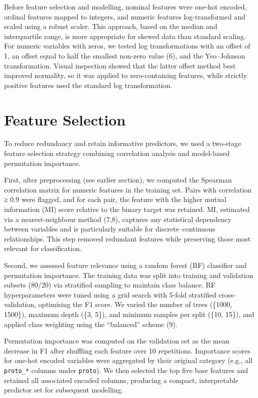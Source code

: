 \documentclass[
  a4paper,
]{scrreprt}
\begin{document}
Before feature selection and modelling, nominal features were one-hot
encoded, ordinal features mapped to integers, and numeric features
log-transformed and scaled using a robust scaler. This approach, based
on the median and interquartile range, is more appropriate for skewed
data than standard scaling. For numeric variables with zeros, we tested
log transformations with an offset of 1, an offset equal to half the
smallest non-zero value (6), and the Yeo--Johnson transformation. Visual
inspection showed that the latter offset method best improved normality,
so it was applied to zero-containing features, while strictly positive
features used the standard log transformation.

\section{Feature Selection}\label{feature-selection}

To reduce redundancy and retain informative predictors, we used a
two-stage feature selection strategy combining correlation analysis and
model-based permutation importance.

First, after preprocessing (see earlier section), we computed the
Spearman correlation matrix for numeric features in the training set.
Pairs with correlation ≥ 0.9 were flagged, and for each pair, the
feature with the higher mutual information (MI) score relative to the
binary target was retained. MI, estimated via a nearest-neighbour method
(7,8), captures any statistical dependency between variables and is
particularly suitable for discrete--continuous relationships. This step
removed redundant features while preserving those most relevant for
classification.

Second, we assessed feature relevance using a random forest (RF)
classifier and permutation importance. The training data was split into
training and validation subsets (80/20) via stratified sampling to
maintain class balance. RF hyperparameters were tuned using a grid
search with 5-fold stratified cross-validation, optimising the F1 score.
We varied the number of trees (\{1000, 1500\}), maximum depth (\{3,
5\}), and minimum samples per split (\{10, 15\}), and applied class
weighting using the ``balanced'' scheme (9).

Permutation importance was computed on the validation set as the mean
decrease in F1 after shuffling each feature over 10 repetitions.
Importance scores for one-hot encoded variables were aggregated by their
original category (e.g., all \texttt{proto\_*} columns under
\texttt{proto}). We then selected the top five base features and
retained all associated encoded columns, producing a compact,
interpretable predictor set for subsequent modelling.
\end{document}

